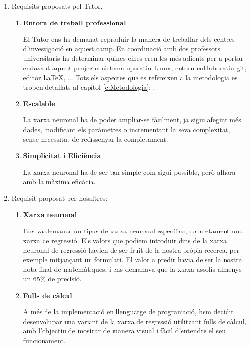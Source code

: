 \begin{enumerate}
 \item Requisits proposats pel Tutor.
    \begin{enumerate}
        \item \textbf{Entorn de treball professional}

        El Tutor ens ha demanat reproduir la manera de treballar dels centres d'investigació en aquest camp. En coordinació amb dos professors universitaris ha determinar quines eines eren les més adients per a portar endavant aquest projecte: sistema operatiu Linux, entorn col$\cdot$laboratiu git, editor LaTeX, ... Tots els aspectes que es refereixen a la metodologia es troben detallats al capítol \ref{c:Metodologia}: .

        \item \textbf{Escalable}

        La xarxa neuronal ha de poder ampliar-se fàcilment, ja sigui afegint més dades, modificant els paràmetres o incrementant la seva complexitat, sense necessitat de redissenyar-la completament.

        \item \textbf{Simplicitat i Eficiència}

        La xarxa neuronal ha de ser tan simple com sigui possible, però alhora amb la màxima eficàcia.

    \end{enumerate}
\clearpage
 \item Requisit proposat per nosaltres:
    \begin{enumerate}
        \item \textbf{Xarxa neuronal}

        Ens va demanar un tipus de xarxa neuronal específica, concretament una xarxa de regressió. Els valors que podíem introduir dins de la xarxa neuronal de regressió havien de ser fruit de la nostra pròpia recerca, per exemple mitjançant un formulari. El valor a predir havia de ser la nostra nota final de matemàtiques, i ens demanava que la xarxa assolís almenys un 65\% de precisió.

        \item \textbf{Fulls de càlcul}

        A més de la implementació en llenguatge de programació, hem decidit desenvolupar una variant de la xarxa de regressió utilitzant fulls de càlcul, amb l’objectiu de mostrar de manera visual i fàcil d'entendre el seu funcionament.
    \end{enumerate}

\end{enumerate}









%
